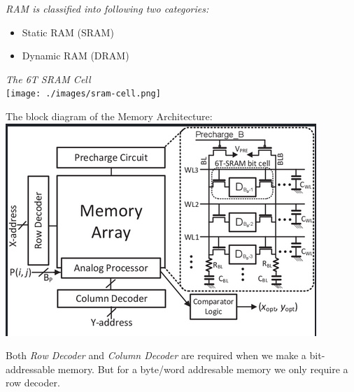 \documentclass[12pt, letterpaper]{article}
\begin{document}
\emph{RAM is classified into following two categories:}
\begin{itemize}
    \item Static RAM (SRAM)
    \item Dynamic RAM (DRAM)
\end{itemize}

\emph{The 6T SRAM Cell} \\
\texttt{[image: ./images/sram-cell.png]}

The block diagram of the Memory Architecture: \\
\includegraphics[scale=0.7]{./images/det_mem_arch.png}

Both \emph{Row Decoder} and \emph{Column Decoder} are required when we make a bit-addressable memory.
But for a byte/word addresable memory we only require a row decoder.
\end{document}
